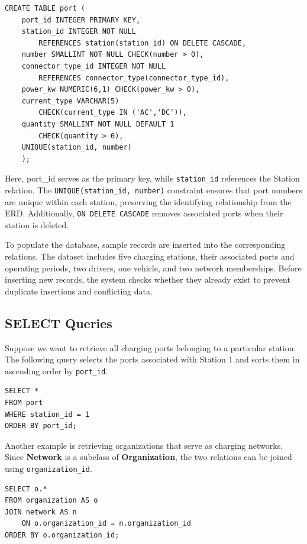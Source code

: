 \documentclass[sigconf,screen,nonacm]{acmart}
\begin{document}
\begin{verbatim}
CREATE TABLE port (
    port_id INTEGER PRIMARY KEY,
    station_id INTEGER NOT NULL
        REFERENCES station(station_id) ON DELETE CASCADE,
    number SMALLINT NOT NULL CHECK(number > 0),
    connector_type_id INTEGER NOT NULL
        REFERENCES connector_type(connector_type_id),
    power_kw NUMERIC(6,1) CHECK(power_kw > 0),
    current_type VARCHAR(5)
        CHECK(current_type IN ('AC','DC')),
    quantity SMALLINT NOT NULL DEFAULT 1
        CHECK(quantity > 0),
    UNIQUE(station_id, number)
    );
\end{verbatim}

Here, \texttt{}{port\_id} serves as the primary key, while \texttt{station\_id} references the Station relation. The \texttt{UNIQUE(station\_id, number)} constraint ensures that port numbers are unique within each station, preserving the identifying relationship from the ERD. Additionally, \texttt{ON DELETE CASCADE} removes associated ports when their station is deleted.

To populate the database, sample records are inserted into the corresponding relations. The dataset includes five charging stations, their associated ports and operating periods, two drivers, one vehicle, and two network memberships. Before inserting new records, the system checks whether they already exist to prevent duplicate insertions and conflicting data.

\subsection{SELECT Queries}
Suppose we want to retrieve all charging ports belonging to a particular station. The following query selects the ports associated with Station 1 and sorts them in ascending order by \texttt{port\_id}.

\begin{verbatim}
SELECT *
FROM port
WHERE station_id = 1
ORDER BY port_id;
\end{verbatim}

Another example is retrieving organizations that serve as charging networks. Since \textbf{Network} is a subclass of \textbf{Organization}, the two relations can be joined using \texttt{organization\_id}.

\begin{verbatim}
SELECT o.*
FROM organization AS o
JOIN network AS n
    ON o.organization_id = n.organization_id
ORDER BY o.organization_id;
\end{verbatim}
\end{document}
